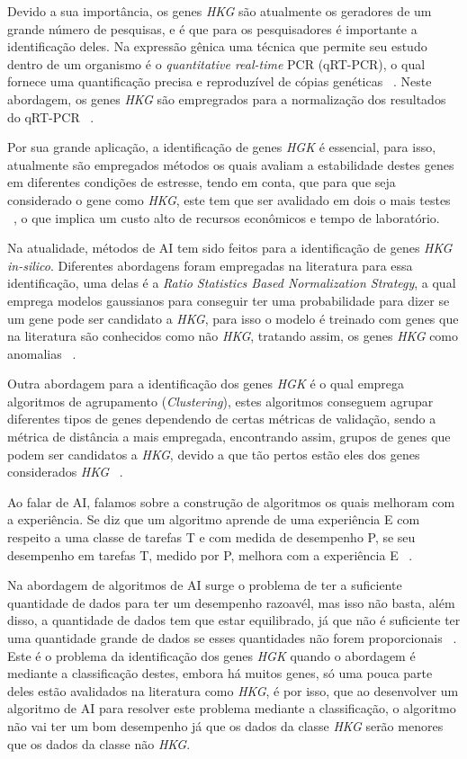 \documentclass[
	12pt,				%
	openright,			%
	oneside,			%
	a4paper,			%
	english,			%
	brazil				%
	]{abntex2}
\begin{document}
Devido a sua importância, os genes \textit{HKG} são atualmente os geradores de um grande número de pesquisas, e é que para os pesquisadores é importante a identificação deles. Na expressão gênica uma técnica que permite seu estudo dentro de um organismo é o \textit{quantitative real-time} PCR (qRT-PCR), o qual fornece uma quantificação precisa e reproduzível de cópias genéticas ~\cite{heid1996real}. Neste abordagem, os genes \textit{HKG} são empregrados para a normalização dos resultados do qRT-PCR ~\cite{de2008identification}.

Por sua grande aplicação, a identificação de genes \textit{HGK} é essencial, para isso, atualmente são empregados métodos os quais avaliam a estabilidade destes genes em diferentes condições de estresse, tendo em conta, que para que seja considerado o gene como \textit{HKG}, este tem que ser avalidado em dois o mais testes ~\cite{rocha2015bacterial}, o que implica um custo alto de recursos econômicos e tempo de laboratório.

Na atualidade, métodos de AI tem sido feitos para a identificação de genes \textit{HKG in-silico}. Diferentes abordagens foram empregadas na literatura para essa identificação, uma delas é a \textit{Ratio Statistics Based Normalization Strategy}, a qual emprega modelos gaussianos para conseguir ter uma probabilidade para dizer se um gene pode ser candidato a \textit{HKG}, para isso o modelo é treinado com genes que na literatura são conhecidos como não \textit{HKG}, tratando assim, os genes \textit{HKG} como anomalias ~\cite{sengupta2015computational}.

Outra abordagem para a identificação dos genes \textit{HGK} é o qual emprega algoritmos de agrupamento (\textit{Clustering}), estes algoritmos conseguem agrupar diferentes tipos de genes dependendo de certas métricas de validação, sendo a métrica de distância a mais empregada, encontrando assim, grupos de genes que podem ser candidatos a \textit{HKG}, devido a que tão pertos estão eles dos genes considerados \textit{HKG}  ~\cite{berghoff2017rna}.

Ao falar de AI, falamos sobre a construção de algoritmos os quais melhoram com a experiência. Se diz que um algoritmo aprende de uma experiência E com respeito a uma classe de tarefas T e com medida de desempenho P, se seu desempenho em tarefas T, medido por P, melhora com a experiência E ~\cite{jordan2015machine}.

Na abordagem de algoritmos de AI surge o problema de ter a suficiente quantidade de dados para ter um desempenho razoavél, mas isso não basta, além disso, a quantidade de dados tem que estar equilibrado, já que não é suficiente ter uma quantidade grande de dados se esses quantidades não forem proporcionais ~\cite{visa2005issues}. Este é o problema da identificação dos genes \textit{HGK} quando o abordagem é mediante a classificação destes, embora há muitos genes, só uma pouca parte deles estão avalidados na literatura como \textit{HKG}, é por isso, que ao desenvolver um algoritmo de AI para resolver este problema mediante a classificação, o algoritmo não vai ter um bom desempenho já que os dados da classe \textit{HKG} serão menores que os dados da classe não \textit{HKG}.
\end{document}
